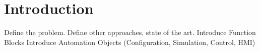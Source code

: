 \chapter{Introduction}
\label{introduction}

Define the problem.
Define other approaches, state of the art.
Introduce Function Blocks
Introduce Automation Objects
(Configuration, Simulation, Control, HMI)